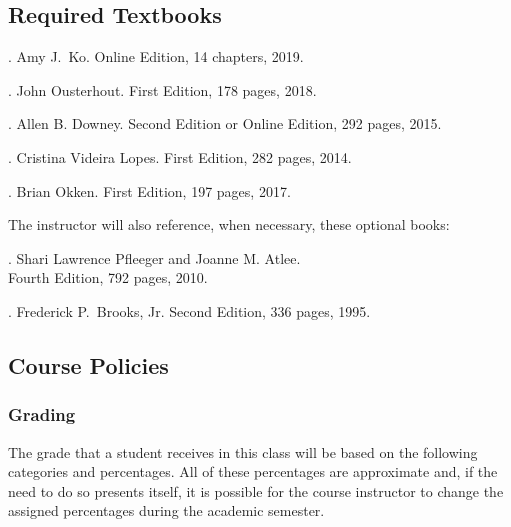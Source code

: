 \documentclass[11pt]{article}
\begin{document}
\vspace*{-.25em}
\subsection*{Required Textbooks}

. Amy J.\ Ko.
Online Edition, 14 chapters, 2019.
%
\vspace*{.25em}

. John Ousterhout.
First Edition, 178 pages, 2018.
%
\vspace*{.25em}

. Allen B. Downey.
Second Edition or Online Edition, 292 pages, 2015.
%
\vspace*{.25em}

. Cristina Videira Lopes.
First Edition, 282 pages, 2014.
%
\vspace*{.25em}

. Brian Okken.
First Edition, 197 pages, 2017.
%
\vspace*{.5em}

\noindent
The instructor will also reference, when necessary, these optional books:
%
\vspace*{.25em}

. Shari Lawrence
Pfleeger and Joanne M. Atlee.\\ Fourth Edition, 792 pages, 2010.
%
\vspace*{.25em}

. Frederick P.\ Brooks, Jr.
Second Edition, 336 pages, 1995.

\vspace*{-.25em}
\subsection*{Course Policies}

\subsubsection*{Grading}

The grade that a student receives in this class will be based on the following
categories and percentages. All of these percentages are approximate and, if the
need to do so presents itself, it is possible for the course instructor to
change the assigned percentages during the academic semester.
\end{document}
